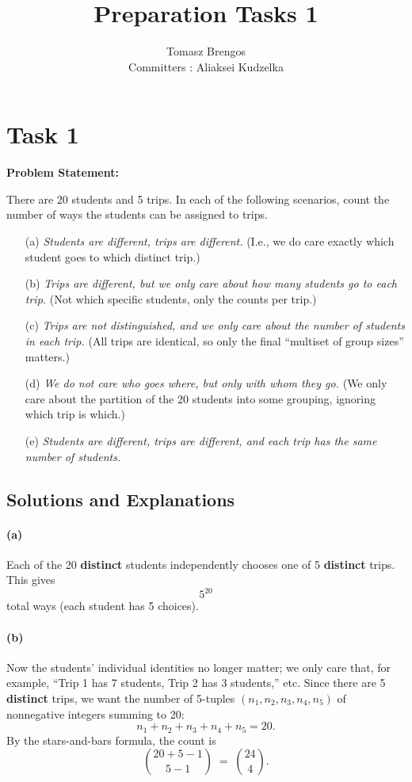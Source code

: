 \documentclass[docmute]{article}
\title{Preparation Tasks 1}
\author{Tomasz Brengos \\  
Committers : Aliaksei Kudzelka}
\date{}
\begin{document}
\maketitle

\section{Task 1}

\textbf{Problem Statement:}

There are 20 students and 5 trips. In each of the following scenarios, count the number of ways the students can be assigned to trips.

\begin{enumerate}
  \item[(a)] \emph{Students are different, trips are different.} (I.e., we do care exactly which student goes to which distinct trip.)
  \item[(b)] \emph{Trips are different, but we only care about how many students go to each trip.} (Not which specific students, only the counts per trip.)
  \item[(c)] \emph{Trips are not distinguished, and we only care about the number of students in each trip.} (All trips are identical, so only the final ``multiset of group sizes'' matters.)
  \item[(d)] \emph{We do not care who goes where, but only with whom they go.} (We only care about the partition of the 20 students into some grouping, ignoring which trip is which.)
  \item[(e)] \emph{Students are different, trips are different, and each trip has the same number of students.}
\end{enumerate}

\subsection*{Solutions and Explanations}

\paragraph{(a)} 
Each of the 20 \textbf{distinct} students independently chooses one of 5 \textbf{distinct} trips. This gives
\[
5^{20}
\]
total ways (each student has 5 choices).

\paragraph{(b)} 
Now the students’ individual identities no longer matter; we only care that, for example, “Trip 1 has 7 students, Trip 2 has 3 students,” etc. Since there are 5 \textbf{distinct} trips, we want the number of 5-tuples \((n_1, n_2, n_3, n_4, n_5)\) of nonnegative integers summing to 20:
\[
n_1 + n_2 + n_3 + n_4 + n_5 = 20.
\]
By the stars-and-bars formula, the count is
\[
\binom{20 + 5 - 1}{5 - 1} \;=\; \binom{24}{4}.
\]
\end{document}
